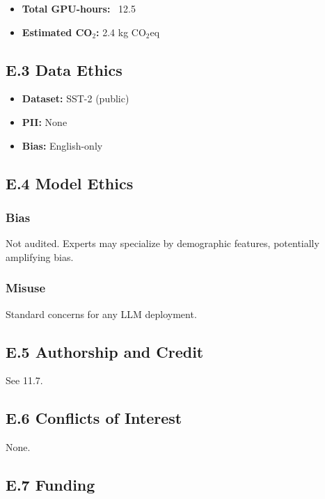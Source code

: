 \begin{itemize}
\item \textbf{Total GPU-hours:} ~12.5
\item \textbf{Estimated CO$_2$:} 2.4 kg CO$_2$eq

\end{itemize}
\subsection{E.3 Data Ethics}

\begin{itemize}
\item \textbf{Dataset:} SST-2 (public)
\item \textbf{PII:} None
\item \textbf{Bias:} English-only

\end{itemize}
\subsection{E.4 Model Ethics}

\subsubsection{Bias}

Not audited. Experts may specialize by demographic features, potentially 
amplifying bias.

\subsubsection{Misuse}

Standard concerns for any LLM deployment.

\subsection{E.5 Authorship and Credit}

See  11.7.

\subsection{E.6 Conflicts of Interest}

None.

\subsection{E.7 Funding}

